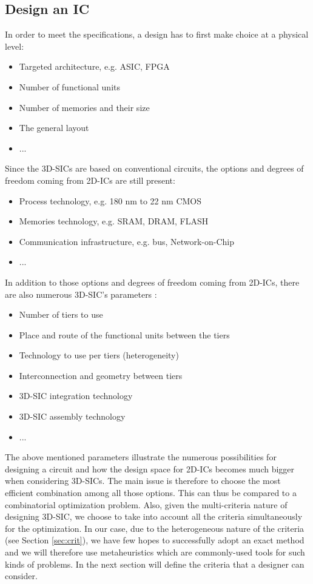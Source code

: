 \subsection{Design an IC}
In order to meet the specifications, a design has to first make choice at a physical level:
\begin{itemize}
\item Targeted architecture, e.g. ASIC, FPGA
\item Number of functional units
\item Number of memories and their size
\item The general layout
\item ...
\end{itemize}
Since the 3D-SICs are based on conventional circuits, the options and degrees of freedom coming from 2D-ICs are still present:
\begin{itemize}
\item Process technology, e.g. 180 nm to 22 nm CMOS
\item Memories technology, e.g. SRAM, DRAM, FLASH
\item Communication infrastructure, e.g. bus, Network-on-Chip
\item ...
\end{itemize}
In addition to those options and degrees of freedom coming from 2D-ICs, there are also numerous 3D-SIC's parameters \cite{659500}:
\begin{itemize}
\item Number of tiers to use
\item Place and route of the functional units between the tiers
\item Technology to use per tiers (heterogeneity)
\item Interconnection and geometry between tiers
\item 3D-SIC integration technology
\item 3D-SIC assembly technology
\item ...
\end{itemize}

The above mentioned parameters illustrate the numerous possibilities for designing a circuit and how the design space for 2D-ICs becomes much bigger when considering 3D-SICs. The main issue is therefore to choose the most efficient combination among all those options. This can thus be compared to a combinatorial optimization problem. Also, given the multi-criteria nature of designing 3D-SIC, we choose to take into account all the criteria simultaneously for the optimization. In our case, due to the heterogeneous nature of the criteria (see Section \ref{sec:crit}), we have few hopes to successfully adopt an exact method and we will therefore use metaheuristics which are commonly-used tools for such kinds of problems. In the next section will define the criteria that a designer can consider.

